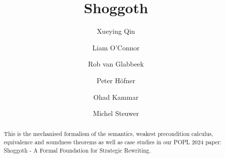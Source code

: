 \documentclass[11pt,a4paper]{article}
\begin{document}
\title{Shoggoth}
\author{Xueying Qin \and Liam O’Connor \and Rob van Glabbeek \and Peter H\"ofner \and Ohad Kammar \and Michel Steuwer}
\maketitle

\begin{abstract}
  This is the mechanised formalism of the semantics, weakest precondition calculus, equivalence and soundness theorems as well as case studies in our POPL 2024 paper: Shoggoth - A Formal Foundation for Strategic Rewriting.
\end{abstract}

\tableofcontents

\begin{flushleft}

\end{flushleft}



\end{document}
